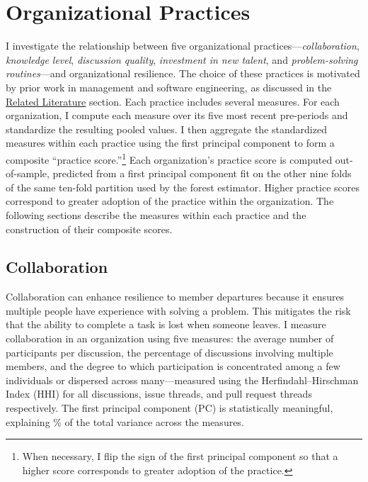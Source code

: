 \documentclass[12pt,notitlepage]{article}
\begin{document}



\section{Organizational Practices} \label{sec:org_practices}
I investigate the relationship between five organizational practices---\textit{collaboration}, \textit{knowledge level}, \textit{discussion quality}, \textit{investment in new talent}, and \textit{problem-solving routines}---and organizational resilience.
The choice of these practices is motivated by prior work in management and software engineering, as discussed in the \hyperref[sec:literature]{Related Literature} section.
Each practice includes several measures.
For each organization, I compute each measure over its five most recent pre-periods and standardize the resulting pooled values.
I then aggregate the standardized measures within each practice using the first principal component to form a composite “practice score.”\footnote{When necessary, I flip the sign of the first principal component so that a higher score corresponds to greater adoption of the practice.}
Each organization's practice score is computed out-of-sample, predicted from a first principal component fit on the other nine folds of the same ten-fold partition used by the forest estimator.
Higher practice scores correspond to greater adoption of the practice within the organization.
The following sections describe the measures within each practice and the construction of their composite scores.

\subsection{Collaboration}
Collaboration can enhance resilience to member departures because it ensures multiple people have experience with solving a problem.
This mitigates the risk that the ability to complete a task is lost when someone leaves.
I measure collaboration in an organization using five measures: the average number of participants per discussion, the percentage of discussions involving multiple members, and the degree to which participation is concentrated among a few individuals or dispersed across many—measured using the Herfindahl–Hirschman Index (HHI) for all discussions, issue threads, and pull request threads respectively.
The first principal component (PC) is statistically meaningful, explaining \CollabVarianceExplained\% of the total variance across the \CollabMeasureCount{} measures.
\end{document}
